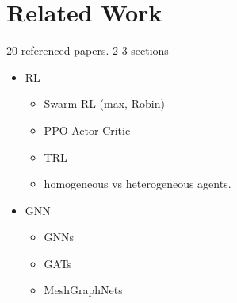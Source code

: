 
\chapter{Related Work}
\label{ch:Related Work}

20 referenced papers. 2-3 sections
\begin{itemize}[noitemsep,nolistsep]
	\item RL
	\begin{itemize}[noitemsep,nolistsep]
        \item Swarm RL (max, Robin)
        \item PPO Actor-Critic
        \item TRL
        \item homogeneous vs heterogeneous agents.
    \end{itemize}
    
	\item GNN
	\begin{itemize}[noitemsep,nolistsep]
        \item GNNs
        \item GATs
        \item MeshGraphNets
    \end{itemize}
\end{itemize}
